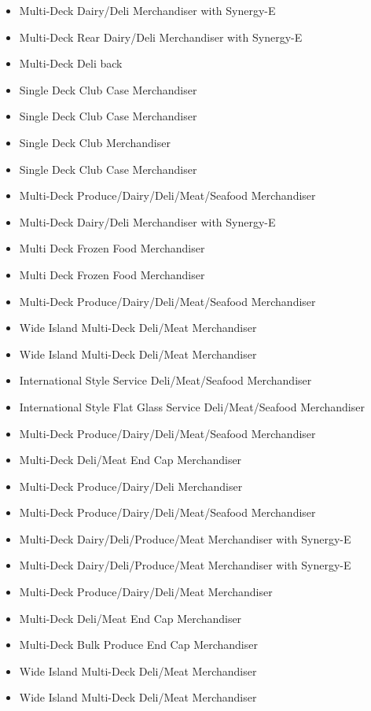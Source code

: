 \begin{itemize}
\item
  Multi-Deck Dairy/Deli Merchandiser with Synergy-E
\item
  Multi-Deck Rear Dairy/Deli Merchandiser with Synergy-E
\item
  Multi-Deck Deli back
\item
  Single Deck Club Case Merchandiser
\item
  Single Deck Club Case Merchandiser
\item
  Single Deck Club Merchandiser
\item
  Single Deck Club Case Merchandiser
\item
  Multi-Deck Produce/Dairy/Deli/Meat/Seafood Merchandiser
\item
  Multi-Deck Dairy/Deli Merchandiser with Synergy-E
\item
  Multi Deck Frozen Food Merchandiser
\item
  Multi Deck Frozen Food Merchandiser
\item
  Multi-Deck Produce/Dairy/Deli/Meat/Seafood Merchandiser
\item
  Wide Island Multi-Deck Deli/Meat Merchandiser
\item
  Wide Island Multi-Deck Deli/Meat Merchandiser
\item
  International Style Service Deli/Meat/Seafood Merchandiser
\item
  International Style Flat Glass Service Deli/Meat/Seafood Merchandiser
\item
  Multi-Deck Produce/Dairy/Deli/Meat/Seafood Merchandiser
\item
  Multi-Deck Deli/Meat End Cap Merchandiser
\item
  Multi-Deck Produce/Dairy/Deli Merchandiser
\item
  Multi-Deck Produce/Dairy/Deli/Meat/Seafood Merchandiser
\item
  Multi-Deck Dairy/Deli/Produce/Meat Merchandiser with Synergy-E
\item
  Multi-Deck Dairy/Deli/Produce/Meat Merchandiser with Synergy-E
\item
  Multi-Deck Produce/Dairy/Deli/Meat Merchandiser
\item
  Multi-Deck Deli/Meat End Cap Merchandiser
\item
  Multi-Deck Bulk Produce End Cap Merchandiser
\item
  Wide Island Multi-Deck Deli/Meat Merchandiser
\item
  Wide Island Multi-Deck Deli/Meat Merchandiser

\end{itemize}
